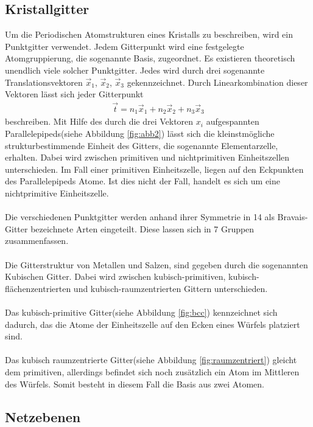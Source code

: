 \subsection{Kristallgitter}
\label{subsec:kristallstrukturen}
Um die Periodischen Atomstrukturen eines Kristalls
zu beschreiben, wird ein Punktgitter verwendet.
Jedem Gitterpunkt wird eine festgelegte Atomgruppierung,
die sogenannte Basis, zugeordnet.
Es existieren theoretisch unendlich viele solcher Punktgitter.
Jedes wird durch drei sogenannte Translationsvektoren
$\vec{x}_{1}$, $\vec{x}_{2}$, $\vec{x}_{3}$ gekennzeichnet.
Durch Linearkombination dieser Vektoren lässt sich
jeder Gitterpunkt
\begin{align}
  \label{eqn:1}
  \vec{t} = n_{1} \vec{x}_{1} + n_{2} \vec{x}_{2} + n_{3} \vec{x}_{3}
\end{align}
beschreiben.
Mit Hilfe des durch die drei Vektoren $x_{i}$ aufgespannten
Parallelepipeds(siehe Abbildung \ref{fig:abb2}) lässt sich die
kleinstmögliche strukturbestimmende Einheit des Gitters,
die sogenannte Elementarzelle, erhalten.
Dabei wird zwischen primitiven und nichtprimitiven Einheitszellen
unterschieden. Im Fall einer primitiven Einheitszelle,
liegen auf den Eckpunkten des Parallelepipeds Atome.
Ist dies nicht der Fall, handelt es sich um eine
nichtprimitive Einheitszelle.\\ \\
Die verschiedenen Punktgitter werden anhand ihrer Symmetrie
in 14 als Bravais-Gitter bezeichnete Arten eingeteilt.
Diese lassen sich in 7 Gruppen zusammenfassen.\\ \\
Die Gitterstruktur von Metallen und Salzen, sind gegeben
durch die sogenannten Kubischen Gitter.
Dabei wird zwischen kubisch-primitiven,
kubisch-flächenzentrierten und
kubisch-raumzentrierten Gittern unterschieden. \\ \\
Das kubisch-primitive Gitter(siehe Abbildung \ref{fig:bcc})
kennzeichnet sich dadurch,
das die Atome der Einheitszelle auf den Ecken
eines Würfels platziert sind.\\ \\
Das kubisch raumzentrierte Gitter(siehe Abbildung \ref{fig:raumzentriert})
gleicht dem primitiven, allerdings befindet sich noch
zusätzlich ein Atom im Mittleren des Würfels.
Somit besteht in diesem Fall die Basis aus zwei Atomen.

\subsection{Netzebenen}
\label{subsec:netzebenen}

